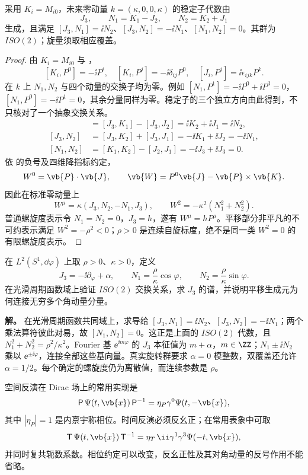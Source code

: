 \begin{proposition}
采用 $K_i=M_{i0}$，未来零动量 $k=(\kappa,0,0,\kappa)$ 的稳定子代数由
\[
 J_3,\qquad N_1=K_1-J_2,\qquad N_2=K_2+J_1
\]
生成，且满足 $[J_3,N_1]=\ii N_2$、$[J_3,N_2]=-\ii N_1$、$[N_1,N_2]=0$。其群为 $ISO(2)$；旋量须取相应覆盖。
\end{proposition}
\begin{proof}
由 $K_i=M_{i0}$ 与 ，
\[
 [K_i,P^0]=-\ii P^i,\quad [K_i,P^j]=-\ii\delta_{ij}P^0,\quad
 [J_i,P^j]=\ii\epsilon_{ijk}P^k.
\]
在 $k$ 上 $N_1,N_2$ 与四个动量的交换子均为零。例如
$[N_1,P^1]=-\ii P^0+\ii P^3=0$，
$[N_1,P^0]=-\ii P^1=0$，其余分量同样为零。稳定子的三个独立方向由此得到，不只核对了一个抽象交换关系。
\begin{align*}
 [J_3,N_1]&=[J_3,K_1]-[J_3,J_2]=\ii K_2+\ii J_1=\ii N_2,\\
 [J_3,N_2]&=[J_3,K_2]+[J_3,J_1]=-\ii K_1+\ii J_2=-\ii N_1,\\
 [N_1,N_2]&=[K_1,K_2]-[J_2,J_1]=-\ii J_3+\ii J_3=0.
\end{align*}
依  的负号及四维降指标约定，
\[
 W^0=\vb{P}\cdot\vb{J},\qquad
 \vb{W}=P^0\vb{J}-\vb{P}\times\vb{K}.
\]
因此在标准零动量上
\[
 W^\mu=\kappa(J_3,N_2,-N_1,J_3),\qquad
 W^2=-\kappa^2(N_1^2+N_2^2).
\]
普通螺旋度表示令 $N_1=N_2=0$，$J_3=h$，遂有 $W^\mu=hP^\mu$。平移部分非平凡的不可约表示满足 $W^2=-\rho^2<0$；$\rho>0$ 是连续自旋标度，绝不是同一类 $W^2=0$ 的有限螺旋度表示。
\end{proof}

\begin{workedexample}[连续自旋为何含无穷多个角动量分量]
在 $L^2(S^1,\dd\varphi)$ 上取 $\rho>0$、$\kappa>0$，定义
\[
 J_3=-\ii\partial_\varphi+\alpha,\qquad
 N_1=\frac\rho\kappa\cos\varphi,\qquad
 N_2=\frac\rho\kappa\sin\varphi.
\]
在光滑周期函数域上验证 $ISO(2)$ 交换关系，求 $J_3$ 的谱，并说明平移生成元为何连接无穷多个角动量分量。

\textbf{解。} 在光滑周期函数共同域上，求导给 $[J_3,N_1]=\ii N_2$、$[J_3,N_2]=-\ii N_1$；两个乘法算符彼此对易，故 $[N_1,N_2]=0$。这正是上面的 $ISO(2)$ 代数，且
$N_1^2+N_2^2=\rho^2/\kappa^2$。Fourier 基 $\ee^{\ii m\varphi}$ 的 $J_3$ 本征值为 $m+\alpha$，$m\in\ZZ$；$N_1\pm\ii N_2$ 乘以 $\ee^{\pm\ii\varphi}$，连接全部这些基向量。真实旋转群要求 $\alpha=0$ 模整数，双覆盖还允许 $\alpha=1/2$。每个确定的螺旋度仍为离散值，而连续参数是 $\rho$。
\end{workedexample}

空间反演在 Dirac 场上的常用实现是
\[
\mathsf P\,\Psi(t,\vb{x})\,\mathsf P^{-1}
=\eta_P\gamma^0\Psi(t,-\vb{x}),
\]
其中 $|\eta_P|=1$ 是内禀宇称相位。时间反演必须反幺正；在常用表象中可取
\[
\mathsf T\,\Psi(t,\vb{x})\,\mathsf T^{-1}
=\eta_T\,\ii\gamma^1\gamma^3\Psi(-t,\vb{x}),
\]
并同时复共轭数系数。相位约定可以改变，反幺正性及其对角动量的反号作用不能省略。

